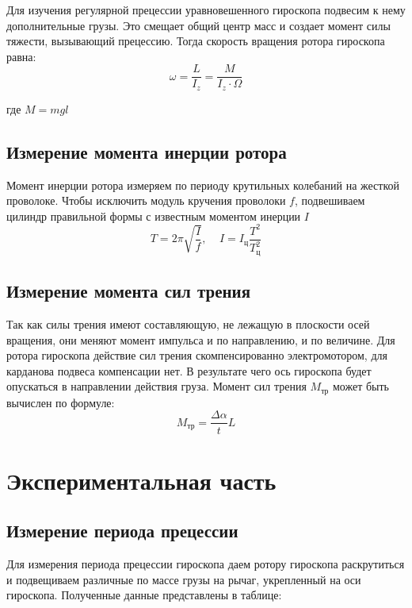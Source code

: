 \documentclass{article}
\begin{document}
\noindent
Для изучения регулярной прецессии уравновешенного гироскопа подвесим к нему дополнительные грузы. Это смещает общий центр масс и создает момент силы тяжести, вызывающий прецессию. Тогда скорость вращения ротора гироскопа равна:
\begin{equation}
    \omega = \frac{L}{I_{z}} = \frac{M}{I_{z}\cdot\Omega} 
\end{equation}

\noindent
где $M = mgl$

\subsection*{Измерение момента инерции ротора}
Момент инерции ротора измеряем по периоду крутильных колебаний на жесткой проволоке. Чтобы исключить модуль кручения проволоки $f$, подвешиваем цилиндр правильной формы с известным моментом инерции $I$
\begin{equation}
     T=2\pi\sqrt{\frac{I}{f}}, \ \ \ \ \ I=I_\text{ц}\frac{T^2}{T^2_\text{ц}}
\end{equation}

\subsection*{Измерение момента сил трения}
Так как силы трения имеют составляющую, не лежащую в плоскости осей вращения, они меняют момент импульса и по направлению, и по величине. Для ротора гироскопа действие сил трения скомпенсированно электромотором, для карданова подвеса компенсации нет. В результате чего ось гироскопа будет опускаться в направлении действия груза. Момент сил трения $M_\text{тр}$ может быть вычислен по формуле: 
\begin{equation}
     M_\text{тр} = \frac{\Delta \alpha}{t}L
\end{equation}

\section*{Экспериментальная часть}
\subsection*{Измерение периода прецессии}
Для измерения периода прецессии гироскопа даем ротору гироскопа раскрутиться и подвещиваем различные по массе грузы на рычаг, укрепленный на оси гироскопа. Полученные данные представлены в таблице:
\end{document}
